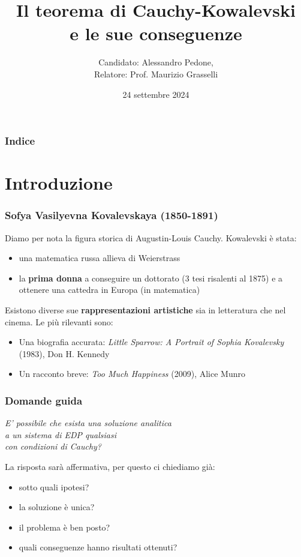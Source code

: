 \documentclass[serif,notheorems]{beamer}
\title{Il teorema di Cauchy-Kowalevski\\ e le sue conseguenze }
\author{Candidato: Alessandro Pedone,\\ Relatore: Prof. Maurizio Grasselli }
\institute{Politecnico di Milano}
\date{24 settembre 2024}
\theoremstyle{definition} %
\theoremstyle{remark}
\begin{document}
\frame{\titlepage}
\begin{frame}
    \frametitle{Indice}
    \tableofcontents
\end{frame}


\section{Introduzione}

\begin{frame}
\frametitle{Sofya Vasilyevna Kovalevskaya (1850-1891)}
Diamo per nota la figura storica di Augustin-Louis Cauchy. 
Kowalevski è stata:
\begin{itemize}
\item una matematica russa allieva di Weierstrass
\item la \textbf{prima donna} a conseguire un dottorato (3 tesi risalenti al 1875) e a ottenere una cattedra in Europa (in matematica)
\end{itemize}
\end{frame}

\begin{frame}
Esistono diverse sue \textbf{rappresentazioni artistiche} sia in letteratura che nel cinema. Le più rilevanti sono:
\begin{itemize}
\item Una biografia accurata: \textit{Little Sparrow: A Portrait of Sophia Kovalevsky} (1983), Don H. Kennedy
\item Un racconto breve: \textit{Too Much Happiness} (2009), Alice Munro
\end{itemize}
\end{frame}


\begin{frame}
\frametitle{Domande guida}
\begin{center}
\textit{E' possibile che esista una soluzione analitica \\ a un sistema di EDP qualsiasi \\ con condizioni di Cauchy?}
\end{center}
\end{frame}

\begin{frame}
La risposta sarà affermativa, per questo ci chiediamo già: 
\begin{itemize}
\item sotto quali ipotesi?
\item la soluzione è unica?
\item il problema è ben posto?
\item quali conseguenze hanno risultati ottenuti?
\end{itemize}
\end{frame}
\end{document}
